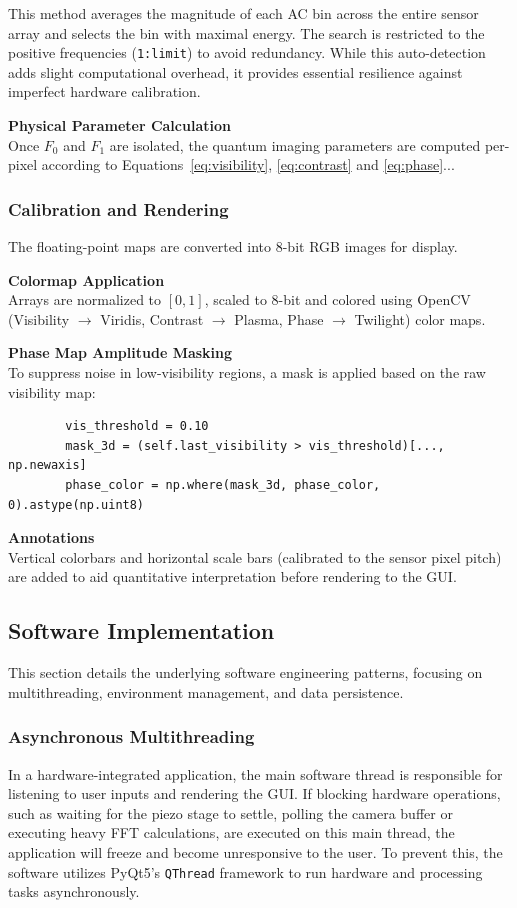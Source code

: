 \documentclass[12pt,a4paper]{article}
\begin{document}
        This method averages the magnitude of each AC bin across the entire sensor array and selects the bin with maximal energy. The search is restricted to the positive frequencies (\texttt{1:limit}) to avoid redundancy. While this auto-detection adds slight computational overhead, it provides essential resilience against imperfect hardware calibration.

        \textbf{Physical Parameter Calculation} \\
        Once $F_0$ and $F_1$ are isolated, the quantum imaging parameters are computed per-pixel according to Equations~\ref{eq:visibility}, \ref{eq:contrast} and \ref{eq:phase}...
        
        \subsubsection{Calibration and Rendering}
        The floating-point maps are converted into 8-bit RGB images for display.

        \textbf{Colormap Application} \\
        Arrays are normalized to $[0, 1]$, scaled to 8-bit and colored using OpenCV (Visibility $\rightarrow$ Viridis, Contrast $\rightarrow$ Plasma, Phase $\rightarrow$ Twilight) color maps.

        \textbf{Phase Map Amplitude Masking} \\
        To suppress noise in low-visibility regions, a mask is applied based on the raw visibility map:
        \begin{verbatim}
        vis_threshold = 0.10
        mask_3d = (self.last_visibility > vis_threshold)[..., np.newaxis]
        phase_color = np.where(mask_3d, phase_color, 0).astype(np.uint8)
        \end{verbatim}

        \textbf{Annotations} \\
        Vertical colorbars and horizontal scale bars (calibrated to the sensor pixel pitch) are added to aid quantitative interpretation before rendering to the \ac{GUI}.

    \subsection{Software Implementation}
    This section details the underlying software engineering patterns, focusing on multithreading, environment management, and data persistence.

        \subsubsection{Asynchronous Multithreading}
        In a hardware-integrated application, the main software thread is responsible for listening to user inputs and rendering the \ac{GUI}. If blocking hardware operations, such as waiting for the piezo stage to settle, polling the camera buffer or executing heavy \ac{FFT} calculations, are executed on this main thread, the application will freeze and become unresponsive to the user. To prevent this, the software utilizes PyQt5's \texttt{QThread} framework to run hardware and processing tasks asynchronously.
\end{document}
